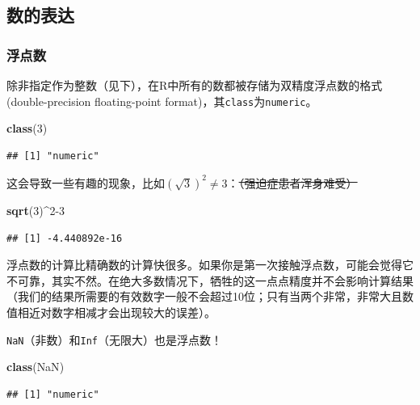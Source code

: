 \documentclass[]{book}
\newenvironment{Shaded}{\begin{snugshade}}{\end{snugshade}}
\newcommand{\DecValTok}[1]{\textcolor[rgb]{0.00,0.00,0.81}{#1}}
\newcommand{\KeywordTok}[1]{\textcolor[rgb]{0.13,0.29,0.53}{\textbf{#1}}}
\newcommand{\NormalTok}[1]{#1}
\newcommand{\OperatorTok}[1]{\textcolor[rgb]{0.81,0.36,0.00}{\textbf{#1}}}
\newcommand{\OtherTok}[1]{\textcolor[rgb]{0.56,0.35,0.01}{#1}}
\begin{document}
\hypertarget{math-notation}{%
\subsection{数的表达}\label{math-notation}}

\subsubsection{浮点数}

除非指定作为整数（见下），在R中所有的数都被存储为双精度浮点数的格式 (double-precision floating-point format)，其\texttt{class}为\texttt{numeric}。

\begin{Shaded}
\begin{Highlighting}[]
\KeywordTok{class}\NormalTok{(}\DecValTok{3}\NormalTok{)}
\end{Highlighting}
\end{Shaded}

\begin{verbatim}
## [1] "numeric"
\end{verbatim}

这会导致一些有趣的现象，比如\((\sqrt{3})^2 \neq 3\)：\sout{（强迫症患者浑身难受）}

\begin{Shaded}
\begin{Highlighting}[]
\KeywordTok{sqrt}\NormalTok{(}\DecValTok{3}\NormalTok{)}\OperatorTok{^}\DecValTok{2-3}
\end{Highlighting}
\end{Shaded}

\begin{verbatim}
## [1] -4.440892e-16
\end{verbatim}

浮点数的计算比精确数的计算快很多。如果你是第一次接触浮点数，可能会觉得它不可靠，其实不然。在绝大多数情况下，牺牲的这一点点精度并不会影响计算结果（我们的结果所需要的有效数字一般不会超过10位；只有当两个非常，非常大且数值相近对数字相减才会出现较大的误差）。

\texttt{NaN}（非数）和\texttt{Inf}（无限大）也是浮点数！

\begin{Shaded}
\begin{Highlighting}[]
\KeywordTok{class}\NormalTok{(}\OtherTok{NaN}\NormalTok{)}
\end{Highlighting}
\end{Shaded}

\begin{verbatim}
## [1] "numeric"
\end{verbatim}
\end{document}
